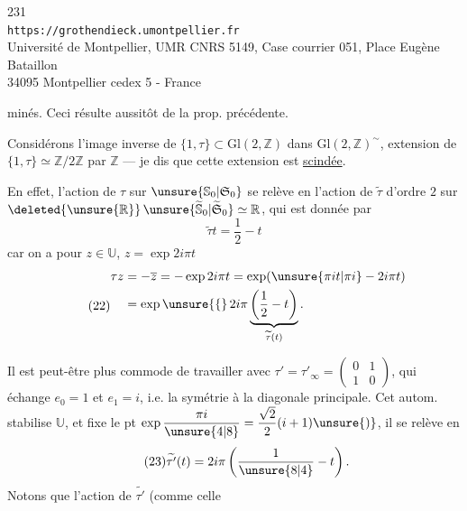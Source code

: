 
\begin{center}
231\\
\texttt{https://grothendieck.umontpellier.fr}\\
Université de Montpellier, UMR CNRS 5149, Case courrier 051, Place Eugène Bataillon\\
34095 Montpellier cedex 5 - France
\end{center}


minés. Ceci résulte 
aussitôt de la prop. précédente.

Considérons l'image inverse de $\{1,\tau\}\subset\mathrm{Gl}(2,\mathbb Z)$
dans $\mathrm{Gl}(2,\mathbb Z)^{\sim}$,
 extension de
$\{1,\tau\}\simeq\mathbb Z/2\mathbb Z$ par $\mathbb Z$
--- je dis que cette extension est \uline{scindée}.


En effet, l'action de $\tau$ sur $\unsure{\mathbb S_0|\mathfrak S_0}$
se relève en l'action de $\widetilde\tau$ 
d'ordre $2$ sur
$\deleted{\unsure{\mathbb R}}\,
\unsure{\widetilde{\mathbb S}_0|\widetilde{\mathfrak S}_0}\simeq\mathbb R$,
qui est donnée par
\[
\tag{21}
\widetilde\tau t=\frac12-t
\]
car on a pour $z\in\mathbb U$, $z=\exp 2i\pi t$
\[
\tag{22}
\begin{aligned}
\tau z&=-\overline z=-\exp 2i\pi t
=\exp(\unsure{\pi it|\pi i}-2i\pi t)\\
&=\exp\unsure{\{}\,2i\pi
\underbrace{\left(\frac12-t\right)}_{\widetilde\tau(t)}.
\end{aligned}
\]

 Il est peut-être plus commode de travailler avec
$\tau'=\tau'_\infty=\begin{pmatrix}0&1\\1&0\end{pmatrix}$,
qui  échange $e_0=1$ et $e_1=i$,
i.e. la symétrie  à la diagonale principale.
Cet autom. stabilise $\mathbb U$, et fixe le pt
$\exp\dfrac{\pi i}{\unsure{4|8}}=\dfrac{\sqrt2}{2}(i+1)\unsure{)}$,
il se relève en
\[
\tag{23}
\widetilde{\tau'}(t)=2i\pi\left(\frac1{\unsure{8|4}}-t\right).
\]
Notons que 
l'action de $\widetilde{\tau'}$ (comme celle

